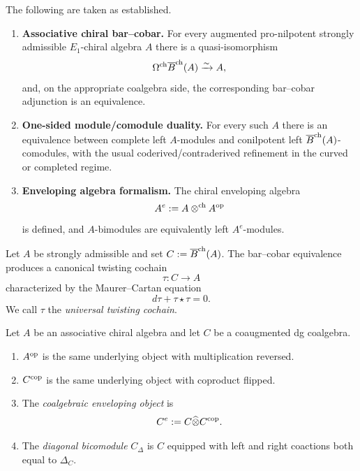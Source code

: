 \begin{hypothesis}
\label{hyp:inputs}
The following are taken as established.
\begin{enumerate}[label=(I)]
\item \textbf{Associative chiral bar--cobar.}
For every augmented pro-nilpotent strongly admissible $E_1$-chiral algebra $A$ there is a
quasi-isomorphism
\[
\Omega^{\mathrm{ch}} \overline{B}^{\mathrm{ch}}(A)\xrightarrow{\sim} A,
\]
and, on the appropriate coalgebra side, the corresponding bar--cobar adjunction is an equivalence.

\item \textbf{One-sided module/comodule duality.}
For every such $A$ there is an equivalence between complete left $A$-modules and conilpotent left
$\overline{B}^{\mathrm{ch}}(A)$-comodules, with the usual coderived/contraderived refinement in the curved or completed
regime.

\item \textbf{Enveloping algebra formalism.}
The chiral enveloping algebra
\[
A^e := A\mathbin{\otimes^{\mathrm{ch}}} A^{\mathrm{op}}
\]
is defined, and $A$-bimodules are equivalently left $A^e$-modules.
\end{enumerate}
\end{hypothesis}

\begin{definition}
Let $A$ be strongly admissible and set $C:=\overline{B}^{\mathrm{ch}}(A)$. The bar--cobar equivalence produces a
canonical twisting cochain
\[
\tau:C\to A
\]
characterized by the Maurer--Cartan equation
\[
d\tau+\tau\star\tau=0.
\]
We call $\tau$ the \emph{universal twisting cochain}.
\end{definition}

\begin{definition}
Let $A$ be an associative chiral algebra and let $C$ be a coaugmented dg coalgebra.
\begin{enumerate}[label=(\alph*)]
\item $A^{\mathrm{op}}$ is the same underlying object with multiplication reversed.
\item $C^{\mathrm{cop}}$ is the same underlying object with coproduct flipped.
\item The \emph{coalgebraic enveloping object} is
\[
C^e:=C\widehat\otimes C^{\mathrm{cop}}.
\]
\item The \emph{diagonal bicomodule} $C_\Delta$ is $C$ equipped with left and right coactions both
equal to $\Delta_C$.
\end{enumerate}
\end{definition}

